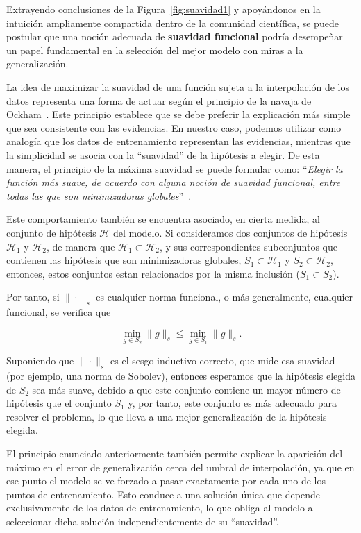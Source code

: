 Extrayendo conclusiones de la Figura~\ref{fig:suavidad1} y apoyándonos en la intuición ampliamente compartida dentro de la comunidad científica, se puede postular que una noción adecuada de \textbf{suavidad funcional} podría desempeñar un papel fundamental en la selección del mejor modelo con miras a la generalización.  

La idea de maximizar la suavidad de una función sujeta a la interpolación de los datos representa una forma de actuar según el principio de la navaja de Ockham~\cite{Blumer1987}. Este principio establece que se debe preferir la explicación más simple que sea consistente con las evidencias. En nuestro caso, podemos utilizar como analogía que los datos de entrenamiento representan las evidencias, mientras que la simplicidad se asocia con la ``suavidad'' de la hipótesis a elegir. De esta manera, el principio de la máxima suavidad se puede formular como: ``\textit{Elegir la función más suave, de acuerdo con alguna noción de suavidad funcional, entre todas las que son minimizadoras globales}''~\cite{Belkin2021}.

Este comportamiento también se encuentra asociado, en cierta medida, al conjunto de hipótesis $\mathcal{H}$ del modelo. Si consideramos dos conjuntos de hipótesis $\mathcal{H}_1$ y $\mathcal{H}_2$, de manera que $\mathcal{H}_1 \subset \mathcal{H}_2$, y sus correspondientes subconjuntos que contienen las hipótesis que son minimizadoras globales, $S_1 \subset \mathcal{H}_1$ y $S_2 \subset \mathcal{H}_2$, entonces, estos conjuntos estan relacionados por la misma inclusión ($S_1 \subset S_2$).

Por tanto, si $\| \cdot \|_{s}$ es cualquier norma funcional, o más generalmente, cualquier funcional, se verifica que

\[
    \min_{g \in S_2} \| g \|_{s} \leq \min_{g \in S_1} \| g \|_{s}.
\]

Suponiendo que $\| \cdot \|_{s}$ es el sesgo inductivo correcto, que mide esa suavidad (por ejemplo, una norma de Sobolev), entonces esperamos que la hipótesis elegida de $S_2$ sea más suave, debido a que este conjunto contiene un mayor número de hipótesis que el conjunto $S_1$ y, por tanto, este conjunto es más adecuado para resolver el problema, lo que lleva a una mejor generalización de la hipótesis elegida.

El principio enunciado anteriormente también permite explicar la aparición del máximo en el error de generalización cerca del umbral de interpolación, ya que en ese punto el modelo se ve forzado a pasar exactamente por cada uno de los puntos de entrenamiento. Esto conduce a una solución única que depende exclusivamente de los datos de entrenamiento, lo que obliga al modelo a seleccionar dicha solución independientemente de su ``suavidad''.


